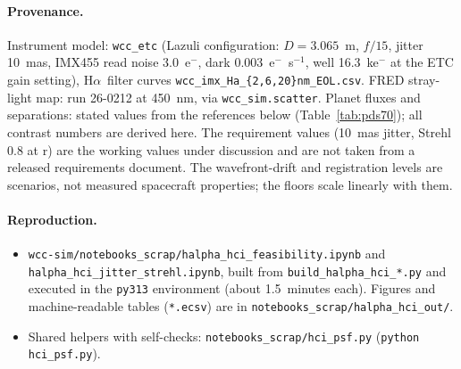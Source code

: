 \documentclass[11pt]{article}
\newcommand{\Ha}{H$\alpha$}
\begin{document}
\paragraph{Provenance.} Instrument model: \texttt{wcc\_etc} (Lazuli configuration: $D = 3.065$~m, $f/15$, jitter 10~mas, IMX455 read noise 3.0~e$^-$, dark 0.003~e$^-$~s$^{-1}$, well 16.3~ke$^-$ at the ETC gain setting), \Ha\ filter curves \texttt{wcc\_imx\_Ha\_\{2,6,20\}nm\_EOL.csv}. FRED stray-light map: run 26-0212 at 450~nm, via \texttt{wcc\_sim.scatter}. Planet fluxes and separations: stated values from the references below (Table~\ref{tab:pds70}); all contrast numbers are derived here. The requirement values (10~mas jitter, Strehl 0.8 at r) are the working values under discussion and are not taken from a released requirements document. The wavefront-drift and registration levels are scenarios, not measured spacecraft properties; the floors scale linearly with them.

\paragraph{Reproduction.}
\begin{itemize}[leftmargin=*]
  \item \texttt{wcc-sim/notebooks\_scrap/halpha\_hci\_feasibility.ipynb} and \texttt{halpha\_hci\_jitter\_strehl.ipynb}, built from \texttt{build\_halpha\_hci\_*.py} and executed in the \texttt{py313} environment (about 1.5~minutes each). Figures and machine-readable tables (\texttt{*.ecsv}) are in \texttt{notebooks\_scrap/halpha\_hci\_out/}.
  \item Shared helpers with self-checks: \texttt{notebooks\_scrap/hci\_psf.py} (\texttt{python hci\_psf.py}).
\end{itemize}
\end{document}

